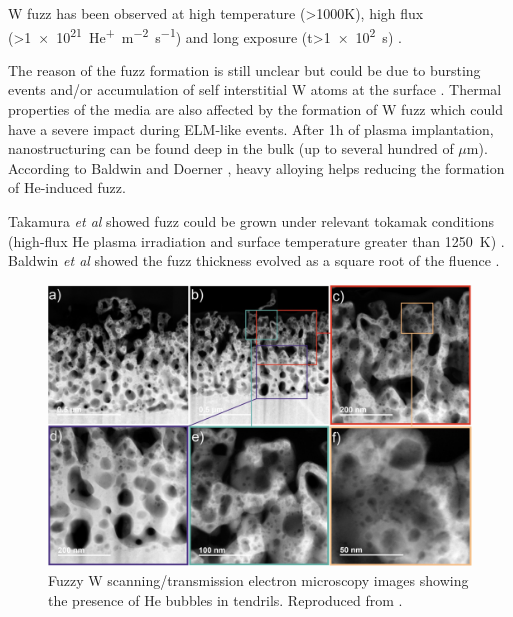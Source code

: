 W \gls{fuzz} has been observed at high temperature (>1000K), high flux (>\SI{1e21}{He^+.m^{-2}.s^{-1}}) and long exposure (t>\SI{1e2}{s}) .

The reason of the \gls{fuzz} formation is still unclear but could be due to bursting events and/or accumulation of self interstitial W atoms at the surface .
Thermal properties of the media are also affected by the formation of W \gls{fuzz}  which could have a severe impact during ELM-like events.
After 1h of \gls{plasma} implantation, nanostructuring can be found deep in the bulk (up to several hundred of $\mu$m).
According to Baldwin and Doerner , heavy alloying helps reducing the formation of He-induced \gls{fuzz}.

Takamura \textit{et al} showed \gls{fuzz} could be grown under relevant \gls{tokamak} conditions (high-flux He \gls{plasma} irradiation and surface temperature greater than \SI{1250}{K}) .
Baldwin \textit{et al} showed the \gls{fuzz} thickness evolved as a square root of the \gls{fluence} \cite{baldwin_effects_2009}.

\begin{figure} [h!]
    \centering
    \includegraphics[width=\linewidth]{Figures/Chapter1/fuzz_mccarthy.jpg}
    \caption{Fuzzy W scanning/transmission electron microscopy images showing the presence of He bubbles in tendrils. Reproduced from \cite{mccarthy_enhanced_2020}.}
\end{figure}

